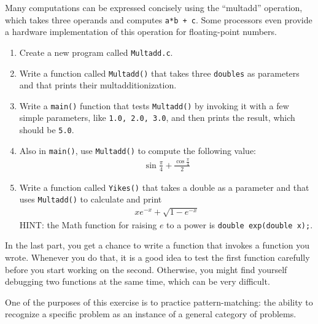 \begin{exercise}
\label{ex.multadd}

Many computations can be expressed concisely using the ``multadd''
operation, which takes three operands and computes {\tt a*b + c}.  Some
processors even provide a hardware implementation of this operation for
floating-point numbers.

\begin{enumerate}

\item Create a new program called {\tt Multadd.c}.

\item Write a function called {\tt Multadd()} that takes three {\tt doubles}
as parameters and that prints their multadditionization.

\item Write a {\tt main()} function that tests {\tt Multadd()} by invoking it with a
few simple parameters, like {\tt 1.0, 2.0, 3.0}, and then prints
the result, which should be {\tt 5.0}.

\item Also in {\tt main()}, use {\tt Multadd()} to compute the
following value:
%
\begin{eqnarray*}
& \sin \frac{\pi}{4} + \frac{\cos \frac{\pi}{4}}{2} & 
\end{eqnarray*}
%
\item Write a function called {\tt Yikes()} that takes a
double as a parameter and that uses {\tt Multadd()} to calculate
and print
%
\begin{eqnarray*}
x e^{-x} + \sqrt{1 - e^{-x}}
\end{eqnarray*}
%
HINT: the Math function for raising $e$ to a power is {\tt double exp(double x);}.

\end{enumerate}

In the last part, you get a chance to write a function that invokes
a function you wrote.  Whenever you do that, it is a good idea to
test the first function carefully before you start working on the
second.  Otherwise, you might find yourself debugging two functions
at the same time, which can be very difficult.

One of the purposes of this exercise is to practice pattern-matching:
the ability to recognize a specific problem as an instance of a
general category of problems.



\end{exercise}